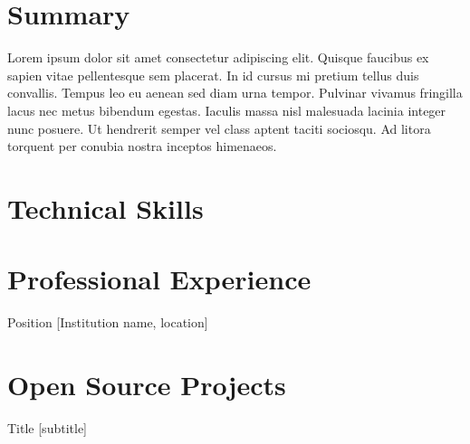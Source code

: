 \documentclass{fp-cv}
\author{john}{doe}
\begin{document}
\noindent
\begin{multicols}{2}
  \noindent
\end{multicols}
\vspace{-13pt}

\section{Summary}

Lorem ipsum dolor sit amet consectetur adipiscing elit. Quisque faucibus ex sapien vitae pellentesque sem placerat. In id cursus mi pretium tellus duis convallis. Tempus leo eu aenean sed diam urna tempor. Pulvinar vivamus fringilla lacus nec metus bibendum egestas. Iaculis massa nisl malesuada lacinia integer nunc posuere. Ut hendrerit semper vel class aptent taciti sociosqu. Ad litora torquent per conubia nostra inceptos himenaeos.

\section{Technical Skills}





\section{Professional Experience}

%
{Position}%
[Institution name, location]


\section{Open Source Projects}

%
{Title}%
[subtitle]
\end{document}
